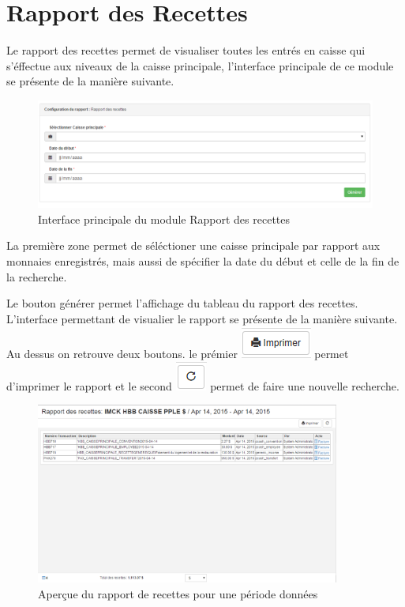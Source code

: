 \documentclass[12pt,a4paper]{report}
\begin{document}
\newpage
\section{Rapport des Recettes}
Le rapport des recettes permet de visualiser toutes les entrés en caisse qui s'éffectue aux niveaux de la caisse principale, l'interface principale de ce module se présente de la manière suivante.

\begin{figure}[h]
\begin{center}
\includegraphics[width=14cm]{pic/RapRecetteCP.png}
\end{center}
\caption{Interface principale du module Rapport des recettes}
\label{Interface principale du module Rapport des recettes}
\end{figure}

La première zone permet de séléctioner une caisse principale par rapport aux monnaies enregistrés, mais aussi de spécifier la date du début et celle de la fin de la recherche. 

Le bouton générer permet l'affichage du tableau du rapport des  recettes. L'interface permettant de visualier le rapport se présente de la manière suivante. Au dessus on retrouve deux boutons. le prémier 
\includegraphics[scale=0.7]{pic/Print.png} permet d'imprimer le rapport et le second \includegraphics[scale=0.7]{pic/refresh.png} permet de faire une nouvelle recherche.

\begin{figure}[h]
\begin{center}
\includegraphics[width=10cm]{pic/RapDetRecette.png}
\end{center}
\caption{Aperçue du rapport de recettes pour une période données}
\label{Aperçue du rapport de recettes pour une période données}
\end{figure}
\end{document}
